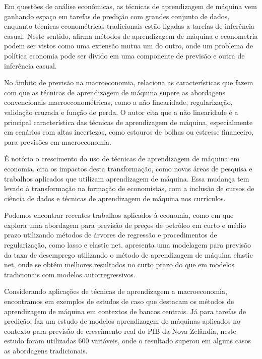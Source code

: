 Em questões de análise econômicas, as técnicas de aprendizagem de máquina vem ganhando espaço em tarefas de predição com grandes conjunto de dados, enquanto técnicas econométricas tradicionais estão ligadas a tarefas de inferência casual. Neste sentido,  afirma métodos de aprendizagem de máquina e econometria podem ser vistos como uma extensão mutua um do outro, onde um problema de política economia pode ser divido em uma componente de previsão e outra de inferência casual.

No âmbito de previsão na macroeconomia,  relaciona as características que fazem com que as técnicas de aprendizagem de máquina supere as abordagens convencionais macroeconométricas, como a não linearidade, regularização, validação cruzada e função de perda. O autor cita que a não linearidade é a principal característica das técnicas de aprendizagem de máquina, especialmente em cenários com altas incertezas, como estouros de bolhas ou estresse financeiro, para previsões em macroeconomia.

É notório o crescimento do uso de técnicas de aprendizagem de máquina em economia.  cita os impactos desta transformação, como novas áreas de pesquisa e trabalhos aplicados que utilizam aprendizagem de máquina. Essa mudança tem levado à transformação na formação de economistas, com a inclusão de cursos de ciência de dados e técnicas de aprendizagem de máquina nos currículos.

Podemos encontrar recentes trabalhos aplicados à economia, como em  que explora uma abordagem para previsão de preços de petróleo em curto e médio prazo utilizando métodos de árvores de regressão e procedimentos de regularização, como lasso e elastic net.  apresenta uma modelagem para previsão da taxa de desemprego utilizando o método de aprendizagem de máquina elastic net, onde se obtém melhores resultados no curto prazo do que em modelos tradicionais com modelos autorregressivos.

Considerando aplicações de técnicas de aprendizagem a macroeconomia, encontramos em  exemplos de estudos de caso que destacam os métodos de aprendizagem de máquina em contextos de bancos centrais. Já para tarefas de predição,  faz um estudo de modelos aprendizagem de máquinas aplicados no contexto para previsão de crescimento real do PIB da Nova Zelândia, neste estudo foram utilizadas 600 variáveis, onde o resultado superou em alguns casos as abordagens tradicionais.   

